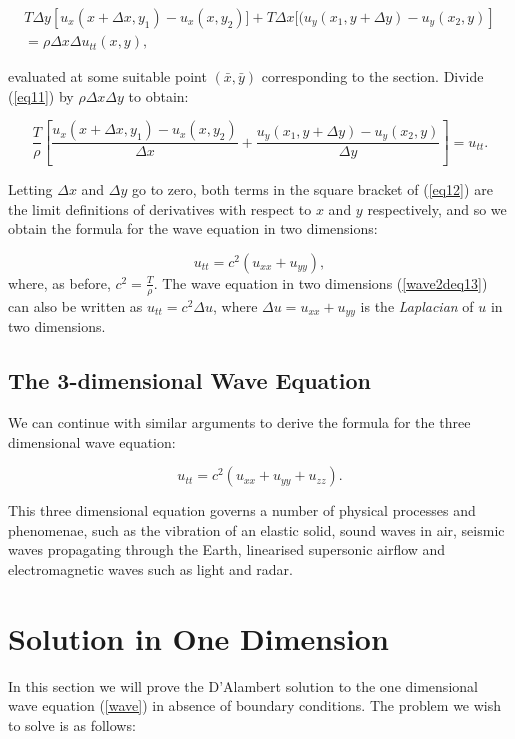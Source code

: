 \documentclass[a4paper, 12pt]{article}
\numberwithin{equation}{section}
\begin{document}
\begin{equation} \label{eq11}
    \begin{split}
    T\Delta y\left[u_x(x+\Delta x, y_1)-u_x(x, y_2)]+T\Delta x[(u_y(x_1, y+\Delta y)-u_y(x_2,y)\right]\\
    =\rho\Delta x\Delta u_{tt}(x,y),
\end{split}
\end{equation}

evaluated at some suitable point $(\bar{x},\bar{y})$ corresponding to the section. Divide (\ref{eq11}) by $\rho\Delta x\Delta y$ to obtain:

\begin{equation} \label{eq12}
    \frac{T}{\rho}\left[\frac{u_x(x+\Delta x, y_1)-u_x(x,y_2)}{\Delta x}+\frac{u_y(x_1,y+ \Delta y)-u_y(x_2,y)}{\Delta y}\right]=u_{tt}.
\end{equation}

Letting $\Delta x$ and $\Delta y$ go to zero, both terms in the square bracket of (\ref{eq12}) are the limit definitions of derivatives with
respect to $x$ and $y$ respectively, and so we obtain the formula for the wave equation in two dimensions:

\begin{equation} \label{wave2deq13}
    u_{tt}=c^2(u_{xx}+u_{yy}),
\end{equation}
where, as before, $c^2=\frac{T}{\rho}$. The wave equation in two dimensions (\ref{wave2deq13}) can also be written as $u_{tt}=c^2\Delta u$, 
where $\Delta u=u_{xx}+u_{yy}$ is the \emph{Laplacian} of $u$ in two dimensions.

\subsection{The 3-dimensional Wave Equation}
We can continue with similar arguments to derive the formula for the three dimensional wave equation:

\begin {equation} \label{wave3deq14}
    u_{tt}=c^2(u_{xx}+u_{yy}+u_{zz}).
\end{equation}

This three dimensional equation governs a number of physical processes and phenomenae, such as the vibration of an elastic solid, 
sound waves in air, seismic waves propagating through the Earth, linearised supersonic airflow and electromagnetic waves such as light and radar.
\cite{Str}

\section{Solution in One Dimension}
In this section we will prove the D'Alambert solution to the one dimensional wave equation (\ref{wave}) 
in absence of boundary conditions. The problem we wish to solve is as follows:
\end{document}
